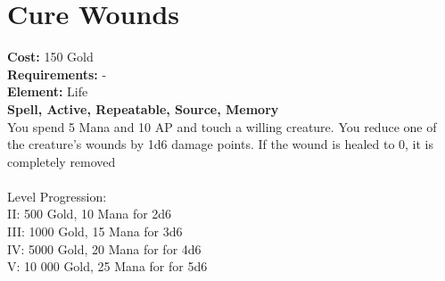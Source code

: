 \section{Cure Wounds}
\textbf{Cost:} 150 Gold\\
\textbf{Requirements:} -\\
\textbf{Element:} Life\\
\textbf{Spell, Active, Repeatable, Source, Memory}\\
You spend 5 Mana and 10 AP and touch a willing creature. You reduce one of the creature's wounds by 1d6 damage points. If the wound is healed to 0, it is completely removed\\
\\
Level Progression:\\
II: 500 Gold, 10 Mana for 2d6\\
III: 1000 Gold, 15 Mana for 3d6\\
IV: 5000 Gold, 20 Mana for for 4d6\\
V: 10 000 Gold, 25 Mana for for 5d6\\